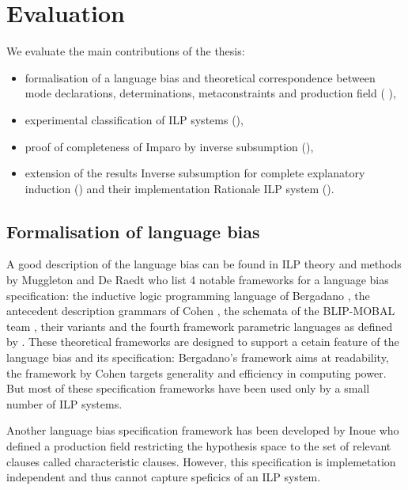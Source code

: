\chapter{Evaluation}\label{ch:evaluation}
We evaluate the main contributions of the thesis:
\begin{itemize}
\item formalisation of a language bias and theoretical correspondence between mode declarations, determinations, metaconstraints and production field ( ),
\item experimental classification of ILP systems (),
\item proof of completeness of Imparo by inverse subsumption (),
\item extension of the results Inverse subsumption for complete explanatory induction () and their implementation Rationale ILP system ().
\end{itemize}

\section{Formalisation of language bias}
A good description of the language bias can be found in ILP theory and methods by Muggleton and De Raedt \cite{muggleton1994inductive} who list 4 notable frameworks for a language bias specification: the inductive logic programming language of
Bergadano \cite{bergadano1993interactive}, the antecedent description grammars of Cohen \cite{cohen1994grammatically}\cite{cohen1992compiling}, the schemata of
the BLIP-MOBAL team \cite{emde1983discovery}\cite{kietz1992controlling}, their variants \cite{de1992interactive}\cite{silverstein1991relational}
\cite{tausend1994representing} and the fourth framework parametric languages as defined by \cite{muggleton1992efficient}\cite{de1992interactive}
\cite{buntine1987induction}\cite{cohen1993learnability}.
These theoretical frameworks are designed to support a cetain feature of the language bias and its specification: Bergadano's framework aims at readability, the framework by Cohen targets generality and efficiency in computing power.
But most of these specification frameworks have been used only by a small number of ILP systems.

Another language bias specification framework has been developed by Inoue \cite{inoue1992linear} who defined a production field restricting the hypothesis space to the set of relevant clauses called characteristic clauses. However, this specification is implemetation independent and thus cannot capture speficics of an ILP system.

